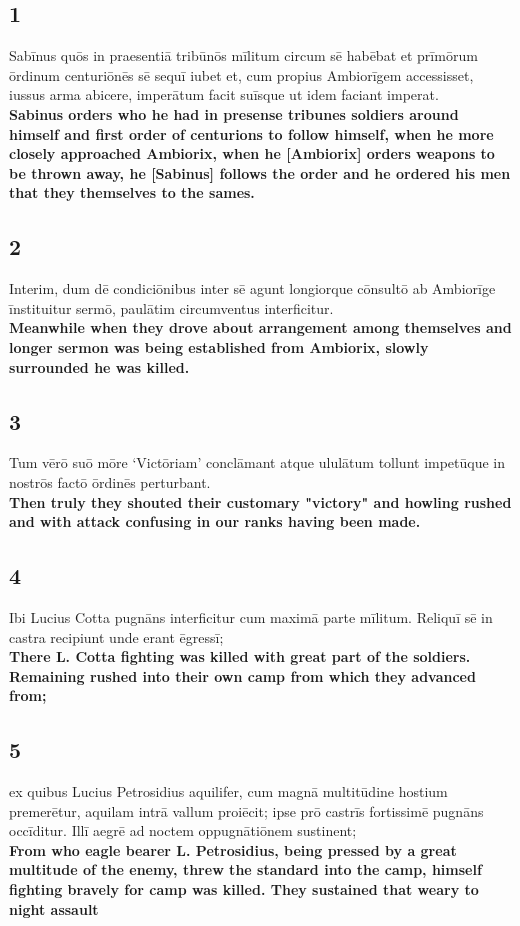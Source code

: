 \documentclass{article}
\begin{document}
\subsection*{1}
Sabīnus quōs in praesentiā tribūnōs mīlitum circum sē habēbat et prīmōrum ōrdinum centuriōnēs sē sequī iubet et, cum propius Ambiorīgem accessisset, iussus arma abicere, imperātum facit suīsque ut idem faciant imperat.  \\
\textbf{Sabinus orders who he had in presense tribunes soldiers around himself and first order of centurions to follow himself, when he more closely approached Ambiorix, when he [Ambiorix] orders weapons to be thrown away, he [Sabinus] follows the order and he ordered his men that they themselves to the sames.}

\subsection*{2}
Interim, dum dē condiciōnibus inter sē agunt longiorque cōnsultō ab Ambiorīge īnstituitur sermō, paulātim circumventus interficitur. \\
\textbf{Meanwhile when they drove about arrangement among themselves and longer sermon was being established from Ambiorix, slowly surrounded he was killed.}

\subsection*{3}
Tum vērō suō mōre ‘Victōriam’ conclāmant atque ululātum tollunt impetūque in nostrōs factō ōrdinēs perturbant.  \\
\textbf{Then truly they shouted their customary "victory" and howling rushed and with attack confusing in our ranks having been made.}


\subsection*{4}
Ibi Lucius Cotta pugnāns interficitur cum maximā parte mīlitum. Reliquī sē in castra recipiunt unde erant ēgressī; \\
\textbf{There L. Cotta fighting was killed with great part of the soldiers. Remaining rushed into their own camp from which they advanced from;}


\subsection*{5}
ex quibus Lucius Petrosidius aquilifer, cum magnā multitūdine hostium premerētur, aquilam intrā vallum proiēcit; ipse prō castrīs fortissimē pugnāns occīditur. Illī aegrē ad noctem oppugnātiōnem sustinent;  \\
\textbf{From who eagle bearer L. Petrosidius, being pressed by a great multitude of the enemy, threw the standard into the camp, himself fighting bravely for camp was killed. They sustained that weary to night assault}
\end{document}
